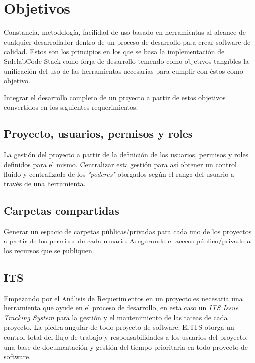 
\chapter{Objetivos}
\label{chap:objetivos}

\par Constancia, metodolog\'ia, facilidad de uso basado en herramientas al alcance de cualquier desarrollador dentro de un proceso de desarrollo para crear software de calidad. Estos son los principios en los que se basa la implementación de SidelabCode Stack como forja de desarrollo teniendo como objetivos tangibles la unificación del uso de las herramientas necesarias para cumplir con éstos como objetivo.

\par Integrar el desarrollo completo de un proyecto a partir de estos objetivos convertidos en los siguientes requerimientos.

\section{Proyecto, usuarios, permisos y roles }
\label{sec:proyecto-usuarios}

\par La gestión del proyecto a partir de la definición de los usuarios, permisos y roles definidos para el mismo. Centralizar esta gestión para así obtener un control fluido y centralizado de los \emph{"poderes"} otorgados según el rango del usuario a través de una herramienta.


\section{Carpetas compartidas}
\label{sec:carpetas-compartidas}

\par Generar un espacio de carpetas p\'ublicas/privadas para cada uno de los proyectos a partir de los permisos de cada usuario. Asegurando el acceso público/privado a los recursos que se publiquen.


\section{ITS}
\label{sec:its}

\par Empezando por el An\'alisis de Requerimientos en un proyecto es necesaria una herramienta que ayude en el proceso de desarrollo, en esta caso un \emph{ITS Issue Tracking System} para la gestión y el mantenimiento de las tareas de cada proyecto. La piedra angular de todo proyecto de software. El ITS otorga un control total del flujo de trabajo y responsabilidades a los usuarios del proyecto, una base de documentación y gestión del tiempo prioritaria en todo proyecto de software.

